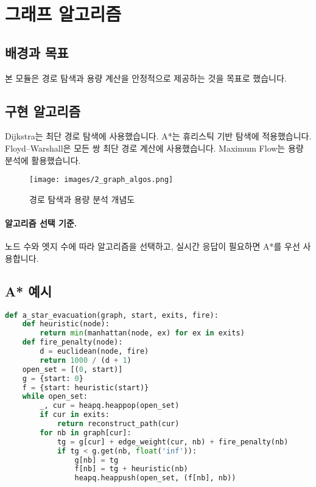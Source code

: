 \section{그래프 알고리즘}

\subsection{배경과 목표}
본 모듈은 경로 탐색과 용량 계산을 안정적으로 제공하는 것을 목표로 했습니다.

\subsection{구현 알고리즘}
Dijkstra는 최단 경로 탐색에 사용했습니다.
A*는 휴리스틱 기반 탐색에 적용했습니다.
Floyd–Warshall은 모든 쌍 최단 경로 계산에 사용했습니다.
Maximum Flow는 용량 분석에 활용했습니다.

\begin{figure}[H]
    \centering
    \texttt{[image: images/2\_graph\_algos.png]}
    \caption{경로 탐색과 용량 분석 개념도}
    \label{fig:graph_algos}
\end{figure}

\paragraph{알고리즘 선택 기준.} 노드 수와 엣지 수에 따라 알고리즘을 선택하고, 실시간 응답이 필요하면 A*를 우선 사용합니다.

\subsection{A* 예시}
\begin{lstlisting}[language=Python]
def a_star_evacuation(graph, start, exits, fire):
    def heuristic(node):
        return min(manhattan(node, ex) for ex in exits)
    def fire_penalty(node):
        d = euclidean(node, fire)
        return 1000 / (d + 1)
    open_set = [(0, start)]
    g = {start: 0}
    f = {start: heuristic(start)}
    while open_set:
        _, cur = heapq.heappop(open_set)
        if cur in exits:
            return reconstruct_path(cur)
        for nb in graph[cur]:
            tg = g[cur] + edge_weight(cur, nb) + fire_penalty(nb)
            if tg < g.get(nb, float('inf')):
                g[nb] = tg
                f[nb] = tg + heuristic(nb)
                heapq.heappush(open_set, (f[nb], nb))
\end{lstlisting}

